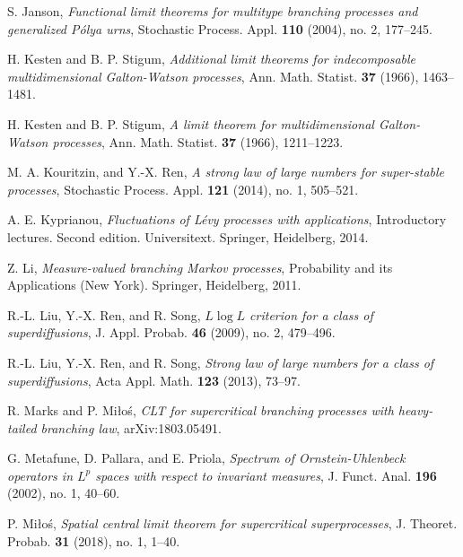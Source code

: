 \documentclass[12pt,a4paper]{amsart}
\theoremstyle{plain}
\theoremstyle{definition}
\numberwithin{equation}{section}
\begin{document}
\begin{thebibliography}{10}
  S. Janson,
  \emph{Functional limit theorems for multitype branching processes and generalized {P}\'{o}lya urns},
  Stochastic Process. Appl. \textbf{110} (2004), no. 2, 177--245.

  H. Kesten and B. P. Stigum,
  \emph{Additional limit theorems for indecomposable multidimensional {G}alton-{W}atson processes},
  Ann. Math. Statist. \textbf{37} (1966), 1463--1481.

  H. Kesten and B. P. Stigum,
  \emph{A limit theorem for multidimensional {G}alton-{W}atson processes},
  Ann. Math. Statist. \textbf{37} (1966), 1211--1223.

  M. A. Kouritzin, and Y.-X. Ren,
  \emph{A strong law of large numbers for super-stable processes},
  Stochastic Process. Appl. \textbf{121} (2014), no. 1, 505--521.

  A. E. Kyprianou,
  \emph{Fluctuations of {L}\'{e}vy processes with applications},
    Introductory lectures. Second edition. Universitext. Springer, Heidelberg, 2014.

  Z. Li,
  \emph{Measure-valued branching {M}arkov processes},
  Probability and its Applications (New York). Springer, Heidelberg, 2011.

  R.-L. Liu, Y.-X. Ren, and R. Song,
  \emph{{$L\log L$} criterion for a class of superdiffusions},
  J. Appl. Probab. \textbf{46} (2009), no. 2, 479--496.

  R.-L. Liu, Y.-X. Ren, and R. Song,
  \emph{Strong law of large numbers for a class of superdiffusions},
  Acta Appl. Math. \textbf{123} (2013), 73--97.

  R. Marks and P. Mi{\l}o{\'s},
  \emph{C{LT} for supercritical branching processes with heavy-tailed branching law},
  arXiv:1803.05491.

  G. Metafune, D. Pallara, and E. Priola,
  \emph{Spectrum of {O}rnstein-{U}hlenbeck operators in {$L^p$} spaces with respect to invariant  measures},
  J. Funct. Anal. \textbf{196} (2002), no. 1, 40--60.

  P. Mi{\l}o{\'s},
  \emph{Spatial central limit theorem for supercritical superprocesses},
  J. Theoret. Probab. \textbf{31} (2018), no. 1, 1--40.


\end{thebibliography}
\end{document}
